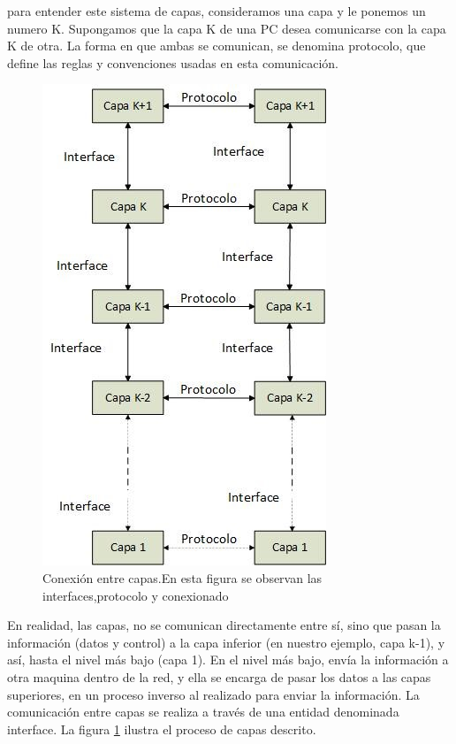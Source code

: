 para entender este sistema de capas, consideramos una capa y le ponemos un numero K. Supongamos que la capa K de una PC desea comunicarse con la capa K de otra. La forma en que ambas se comunican, se denomina protocolo, que define las reglas y convenciones usadas en esta comunicación. 

\begin{figure}
	\centering 
	\includegraphics[scale=0.6]{modcap}
	\caption{Conexión entre capas.En esta figura se observan las interfaces,protocolo y conexionado}
	\label{fig:modOSI}	
\end{figure}
En realidad, las capas, no se comunican directamente entre sí, sino que pasan la información (datos y control) a la capa inferior (en nuestro ejemplo, capa k-1), y así, hasta el nivel más bajo (capa 1). En el nivel más bajo, envía la información a otra maquina dentro de la red, y ella se encarga de pasar los datos a las capas superiores, en un proceso inverso al realizado para enviar la información. La comunicación entre capas se realiza a través de una entidad denominada interface. La figura  \ref{fig:modOSI} ilustra el proceso de capas descrito.

